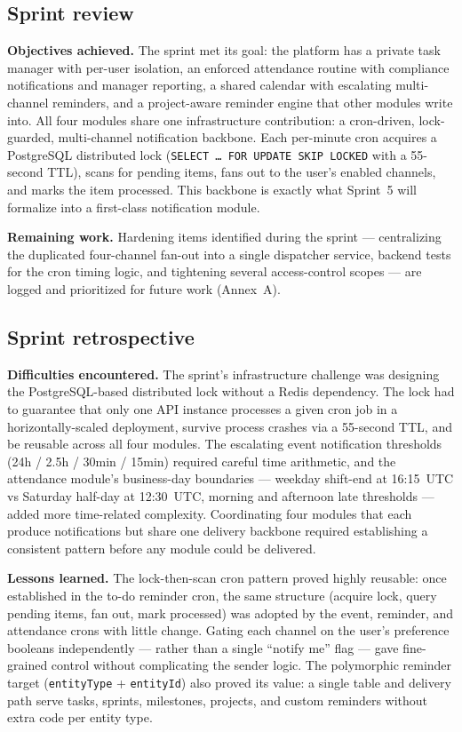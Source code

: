 \subsection{Sprint review}

\textbf{Objectives achieved.} The sprint met its goal: the platform has a private task manager
with per-user isolation, an enforced attendance routine with compliance notifications and
manager reporting, a shared calendar with escalating multi-channel reminders, and a
project-aware reminder engine that other modules write into. All four modules share one
infrastructure contribution: a cron-driven, lock-guarded, multi-channel notification backbone.
Each per-minute cron acquires a PostgreSQL distributed lock (\texttt{SELECT \ldots{} FOR
UPDATE SKIP LOCKED} with a 55-second TTL), scans for pending items, fans out to the user's
enabled channels, and marks the item processed. This backbone is exactly what Sprint~5 will
formalize into a first-class notification module.

\textbf{Remaining work.} Hardening items identified during the sprint --- centralizing the
duplicated four-channel fan-out into a single dispatcher service, backend tests for the cron
timing logic, and tightening several access-control scopes --- are logged and prioritized for
future work (Annex~A).

\subsection{Sprint retrospective}

\textbf{Difficulties encountered.} The sprint's infrastructure challenge was designing the
PostgreSQL-based distributed lock without a Redis dependency. The lock had to guarantee that
only one API instance processes a given cron job in a horizontally-scaled deployment, survive
process crashes via a 55-second TTL, and be reusable across all four modules. The escalating
event notification thresholds (24h / 2.5h / 30min / 15min) required careful time arithmetic,
and the attendance module's business-day boundaries --- weekday shift-end at 16:15~UTC vs
Saturday half-day at 12:30~UTC, morning and afternoon late thresholds --- added more
time-related complexity. Coordinating four modules that each produce notifications but share one
delivery backbone required establishing a consistent pattern before any module could be
delivered.

\textbf{Lessons learned.} The lock-then-scan cron pattern proved highly reusable: once
established in the to-do reminder cron, the same structure (acquire lock, query pending items,
fan out, mark processed) was adopted by the event, reminder, and attendance crons with little
change. Gating each channel on the user's preference booleans independently --- rather than
a single ``notify me'' flag --- gave fine-grained control without complicating the sender logic.
The polymorphic reminder target (\texttt{entityType} + \texttt{entityId}) also proved its value:
a single table and delivery path serve tasks, sprints, milestones, projects, and custom
reminders without extra code per entity type.

